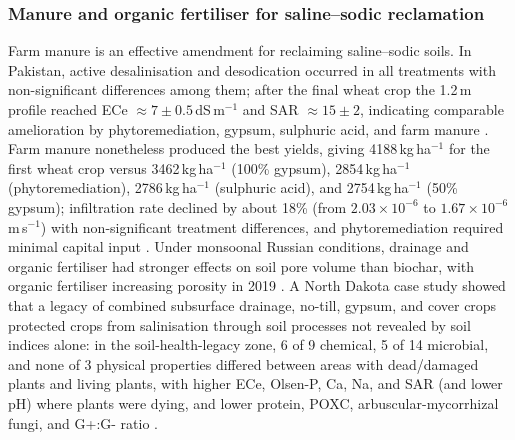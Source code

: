 \subsubsection{Manure and organic fertiliser for saline--sodic reclamation}
Farm manure is an effective amendment for reclaiming saline--sodic soils. In Pakistan, active desalinisation and desodication occurred in all treatments with non-significant differences among them; after the final wheat crop the 1.2\,m profile reached ECe $\approx 7\pm0.5$\,dS\,m$^{-1}$ and SAR $\approx 15\pm2$, indicating comparable amelioration by phytoremediation, gypsum, sulphuric acid, and farm manure \parencite{Qadir2001}. Farm manure nonetheless produced the best yields, giving 4188\,kg\,ha$^{-1}$ for the first wheat crop versus 3462\,kg\,ha$^{-1}$ (100\% gypsum), 2854\,kg\,ha$^{-1}$ (phytoremediation), 2786\,kg\,ha$^{-1}$ (sulphuric acid), and 2754\,kg\,ha$^{-1}$ (50\% gypsum); infiltration rate declined by about 18\% (from $2.03\times10^{-6}$ to $1.67\times10^{-6}$\,m\,s$^{-1}$) with non-significant treatment differences, and phytoremediation required minimal capital input \parencite{Qadir2001}. Under monsoonal Russian conditions, drainage and organic fertiliser had stronger effects on soil pore volume than biochar, with organic fertiliser increasing porosity in 2019 \parencite{Brikmans2025}. A North Dakota case study showed that a legacy of combined subsurface drainage, no-till, gypsum, and cover crops protected crops from salinisation through soil processes not revealed by soil indices alone: in the soil-health-legacy zone, 6 of 9 chemical, 5 of 14 microbial, and none of 3 physical properties differed between areas with dead/damaged plants and living plants, with higher ECe, Olsen-P, Ca, Na, and SAR (and lower pH) where plants were dying, and lower protein, POXC, arbuscular-mycorrhizal fungi, and G+:G- ratio \parencite{Daigh2025}.

